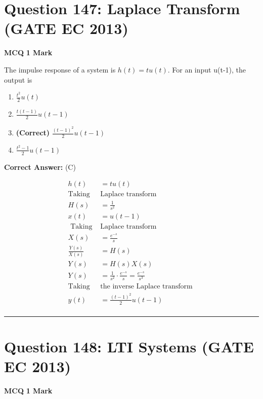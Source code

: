 \documentclass[11pt,a4paper]{article}
\begin{document}
\section*{Question 147: Laplace Transform (GATE EC 2013)}
\noindent \textbf{\color{primary}MCQ} \hfill \textbf{\color{secondary}1 Mark}


\noindent The impulse response of a system is $h\left ( t \right )= tu\left ( t \right )$. For an input u(t-1), the output is


\begin{enumerate}[label=(\Alph*)]
    \item $\frac{t^{2}}{2}u\left ( t \right )$
    \item $\frac{t(t-1)}{2}u(t-1)$
    \item \textbf{(Correct)} $\frac{\left ( t-1 \right )^{2}}{2}u\left ( t-1 \right )$
    \item $\frac{t^{2}-1}{2}u\left ( t-1 \right )$
\end{enumerate}

\noindent \textbf{Correct Answer:} (C)

\begin{tcolorbox}[solbox, title=Detailed Solution -- Question 147]
\[
\begin{aligned} h(t)&=t u(t) \\ \text{Taking }&\text{Laplace transform}\\ H(s)&=\frac{1}{s^{2}} \\ x(t) &=u(t-1) \\ \text { Taking }&\text{Laplace transform } \\ X(s)&=\frac{e^{-s}}{s} \\ \frac{Y(s)}{X(s)}&=H(s) \\ Y(s)&=H(s) X(s) \\ Y(s)&=\frac{1}{s^{2}} \cdot \frac{e^{-s}}{s}=\frac{e^{-s}}{s^{3}} \\ \text{Taking } &\text{the inverse Laplace transform } \\ y(t)&=\frac{(t-1)^{2}}{2} u(t-1) \\ \end{aligned}
\]
\end{tcolorbox}

\vspace{1.5em}
\hrule
\vspace{1.5em}

\section*{Question 148: LTI Systems (GATE EC 2013)}
\noindent \textbf{\color{primary}MCQ} \hfill \textbf{\color{secondary}1 Mark}
\end{document}
